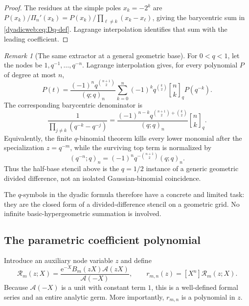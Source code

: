 \documentclass[11pt,oneside]{article}
\theoremstyle{definition}
\theoremstyle{remark}
\newtheorem{remark}[remark]{Remark}
\newcommand{\e}{\mathrm e}
\newcommand{\qbinom}[3]{\genfrac{[}{]}{0pt}{}{#1}{#2}_{#3}}
\begin{document}
\begin{proof}
The residues at the simple poles $x_k=-2^k$ are
$P(x_k)/\Pi_n'(x_k)=P(x_k)/\prod_{\ell\ne k}(x_k-x_\ell)$, giving the barycentric sum in
\eqref{dyadicweb:eq:Dq-def}.  Lagrange interpolation identifies that sum with the leading coefficient.
\end{proof}

\begin{remark}[The same extractor at a general geometric base]
For $0<q<1$, let the nodes be $1,q^{-1},\ldots,q^{-n}$.  Lagrange interpolation gives,
for every polynomial $P$ of degree at most $n$,
\begin{equation}
 [t^n]P(t)
 =\frac{(-1)^nq^{\binom{n+1}{2}}}{(q;q)_n}
  \sum_{k=0}^{n}(-1)^kq^{\binom k2}\qbinom nkq P(q^{-k}).
 \label{dyadicq:eq:q-leading-extractor-general}
\end{equation}
The corresponding barycentric denominator is
\begin{equation}
 \frac1{\displaystyle\prod_{j\ne k}(q^{-k}-q^{-j})}
 =\frac{(-1)^{n-k}q^{\binom{n+1}{2}+\binom k2}}
 {(q;q)_n}\qbinom nkq.                                   \label{dyadicq:eq:barycentric-denominator}
\end{equation}
Equivalently, the finite $q$-binomial theorem kills every lower monomial after the
specialization $z=q^{-m}$, while the surviving top term is normalized by
\begin{equation}
 (q^{-n};q)_n=(-1)^nq^{-\binom{n+1}{2}}(q;q)_n.           \label{dyadicq:eq:q-survivor}
\end{equation}
Thus the half-base stencil above is the $q=1/2$ instance of a generic geometric divided
difference, not an isolated Gaussian-binomial coincidence.
\end{remark}

The $q$-symbols in the dyadic formula therefore have a concrete and limited task: they are the
closed form of a divided-difference stencil on a geometric grid.  No infinite
basic-hypergeometric summation is involved.

\subsection{The parametric coefficient polynomial}

Introduce an auxiliary node variable $z$ and define
\begin{equation}
 \mathscr R_m(z;X)
 =\frac{\e^{-X}B_m(zX)\mathscr A(zX)}{\mathscr A(-X)},
 \qquad
 r_{m,n}(z)=[X^n]\mathscr R_m(z;X).                        \label{dyadicweb:eq:Rmn-def}
\end{equation}
Because $\mathscr A(-X)$ is a unit with constant term $1$, this is a well-defined formal
series and an entire analytic germ.  More importantly, $r_{m,n}$ is a polynomial in $z$.
\end{document}

